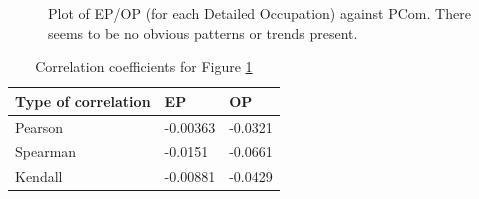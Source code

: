 \documentclass[11pt]{article}
\begin{document}
\begin{figure}[!htb]
	\centering
	\hfill
	\hfill
	\caption{Plot of EP/OP (for each Detailed Occupation) against PCom. There seems to be no obvious patterns or trends present.}
	\label{fig:EP/OP against PCom}
\end{figure}

\begin{table}[]
	\centering
	\begin{tabular}{l|ll|ll}
	\textbf{Type of correlation} & \multicolumn{2}{l|}{\textbf{EP}} & \multicolumn{2}{l}{\textbf{OP}} \\ \hline
	Pearson                      & \multicolumn{2}{l|}{-0.00363}     & \multicolumn{2}{l}{-0.0321}      \\ \hline
	Spearman                     & \multicolumn{2}{l|}{-0.0151}      & \multicolumn{2}{l}{-0.0661}    \\ \hline
	Kendall                      & \multicolumn{2}{l|}{-0.00881}      & \multicolumn{2}{l}{-0.0429}   
	\end{tabular}
	\caption{Correlation coefficients for Figure \ref{fig:EP/OP against PCom}}
	\label{tab:correlation}
	\end{table}
\end{document}
